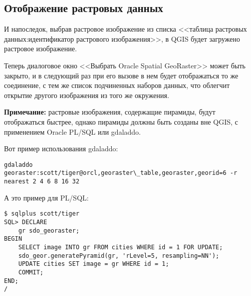 \subsection{Отображение растровых данных}

И напоследок, выбрав растровое изображение из списка <<таблица растровых
данных:идентификатор растрового изображения>>, в QGIS будет загружено
растровое изображение.

Теперь диалоговое окно <<Выбрать Oracle Spatial GeoRaster>> может быть
закрыто, и в следующий раз при его вызове в нем будет отображаться то же
соединение, с тем же список подчиненных наборов данных, что облегчит
открытие другого изображения из того же окружения.

\textbf{Примечание:} растровые изображения, содержащие пирамиды, будут
отображаться быстрее, однако пирамиды должны быть созданы вне QGIS, с
применением Oracle PL/SQL или gdaladdo.

Вот пример использования gdaladdo:

\begin{verbatim}
gdaladdo georaster:scott/tiger@orcl,georaster\_table,georaster,georid=6 -r
nearest 2 4 6 8 16 32
\end{verbatim}

А это пример для PL/SQL:
\begin{verbatim}
$ sqlplus scott/tiger
SQL> DECLARE
    gr sdo_georaster;
BEGIN
    SELECT image INTO gr FROM cities WHERE id = 1 FOR UPDATE;
    sdo_geor.generatePyramid(gr, 'rLevel=5, resampling=NN');
    UPDATE cities SET image = gr WHERE id = 1;
    COMMIT;
END;
/
\end{verbatim}

\FloatBarrier
